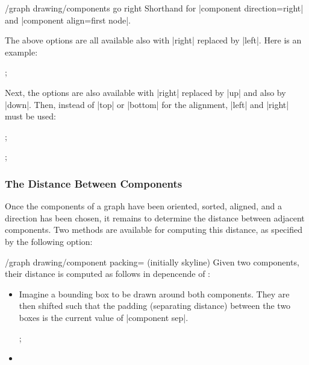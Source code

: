 {\begin{key}{/graph drawing/components go right}
  Shorthand for |component direction=right| and
  |component align=first node|.
\end{key}

The above options are all available also with |right| replaced by
|left|. Here is an example:
\begin{codeexample}[]
\tikz {};
\end{codeexample}
Next, the options are also available with |right| replaced by |up| and
also by |down|. Then, instead of |top| or |bottom| for the alignment,
|left| and |right| must be used:
\begin{codeexample}[]
\tikz {};
\end{codeexample}
\begin{codeexample}[]
\tikz {};
\end{codeexample}



\subsubsection{The Distance Between Components}

Once the components of a graph have been oriented, sorted, aligned,
and a direction has been chosen, it remains to determine the distance
between adjacent components. Two methods are available for computing
this distance, as specified by the following option:

\begin{key}{/graph drawing/component packing= (initially
    skyline)}
  Given two components, their distance is computed as follows in
  depencende of :
  \begin{itemize}
  \item {}

    Imagine a bounding box to be drawn around both components. They
    are then shifted such that the padding (separating distance)
    between the two boxes is the current value of |component sep|.
\begin{codeexample}[]
\tikz {};
\end{codeexample}
  \item {}


\end{itemize}
\end{key}}

